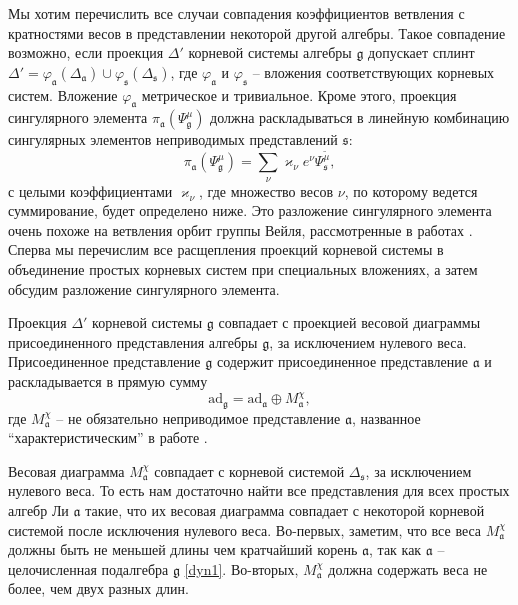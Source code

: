 \documentclass[12pt]{article}
\newcommand{\pia}{\pi_{\mathfrak{a}}}
\newcommand{\gf}{\mathfrak{g}}
\newcommand{\af}{\mathfrak{a}}
\newcommand{\sfr}{\mathfrak{s}}
\begin{document}
Мы хотим перечислить все случаи совпадения коэффициентов ветвления с кратностями весов в
представлении некоторой другой алгебры. Такое совпадение возможно, если проекция $\Delta'$ корневой
системы алгебры $\gf$ допускает сплинт $\Delta'=\varphi_{\af}(\Delta_{\af})\cup
\varphi_{\sfr}(\Delta_{\sfr})$, где  $\varphi_{\af}$ и $\varphi_{\sfr}$ -- вложения соответствующих
корневых систем. Вложение  $\varphi_{\af}$ метрическое и тривиальное. Кроме этого, проекция
сингулярного элемента  $\pia\left(\Psi^{\mu}_{\gf}\right)$ должна раскладываться в линейную
комбинацию сингулярных элементов неприводимых представлений $\sfr$:
\begin{equation}
  \label{eq:4}
  \pia\left(\Psi^{\mu}_{\gf}\right)=\sum_{\nu} \varkappa_{\nu}e^{\nu}\Psi^{\tilde\mu}_{\sfr},
\end{equation}
с целыми коэффициентами  $\varkappa_{\nu}$, где  множество весов  $\nu$, по которому ведется
суммирование, будет определено ниже. Это разложение сингулярного элемента очень похоже на ветвления
орбит группы Вейля, рассмотренные в работах  \cite{larouche2011branching,larouche2009branching}.
Сперва мы перечислим все расщепления проекций корневой системы в объединение простых корневых систем
при специальных вложениях, а затем обсудим разложение сингулярного элемента. 

Проекция  $\Delta'$ корневой системы  $\gf$ совпадает с проекцией весовой диаграммы присоединенного
представления алгебры  $\gf$, за исключением нулевого веса. Присоединенное представление  $\gf$
содержит присоединенное представление  $\af$ и раскладывается в прямую сумму
\begin{equation}
  \label{eq:3}
  \mathrm{ad}_{\gf}=\mathrm{ad}_{\af}\oplus M_{\af}^{\chi},
\end{equation}
где  $M^{\chi}_{\af}$ -- не обязательно неприводимое представление $\af$, названное 
``характеристическим'' в работе \cite{dynkin1952semisimpleru}. 


Весовая диаграмма $M^{\chi}_{\af}$ совпадает с корневой системой  $\Delta_{\sfr}$, за исключением
нулевого веса. То есть нам достаточно найти все представления для всех простых алгебр Ли $\af$
такие, что их весовая диаграмма совпадает с некоторой корневой системой после исключения нулевого
веса. Во-первых, заметим, что все веса  $M^{\chi}_{\af}$ должны быть  не меньшей длины чем
кратчайший корень $\af$, так как $\af$ -- целочисленная подалгебра $\gf$ \ref{dyn1}. Во-вторых,
$M^{\chi}_{\af}$ должна содержать веса не более, чем двух разных длин. 
\end{document}
